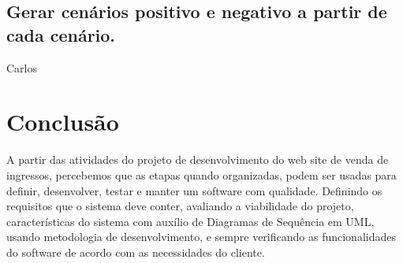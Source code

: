 \documentclass[12pt]{article}
\begin{document}
        \subsection{Gerar cenários positivo e negativo a partir de cada cenário.}
            Carlos
     
\section{Conclusão}
A partir das atividades do projeto de desenvolvimento do web site de venda de ingressos, percebemos que as etapas quando organizadas, podem ser usadas para definir, desenvolver, testar e manter um software com qualidade. Definindo os requisitos que o sistema deve conter, avaliando a viabilidade do projeto, características do sistema com auxílio de Diagramas de Sequência em UML, usando metodologia de desenvolvimento, e sempre verificando as funcionalidades do software de acordo com as necessidades do cliente.

\nocite{*}


\end{document}
